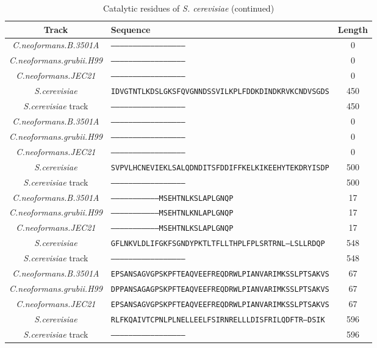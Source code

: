 \begin{table}[htp]\footnotesize
\begin{tabular}{|c|l|c|} \hline
\textbf{Track} & \textbf{Sequence} & \textbf{Length}\\ \hline
\textit{C.neoformans.B.3501A} & \texttt{--------------------------------------------------} & 0
\\
\textit{C.neoformans.grubii.H99} & \texttt{--------------------------------------------------} & 0
\\
\textit{C.neoformans.JEC21} & \texttt{--------------------------------------------------} & 0
\\
\textit{S.cerevisiae} & \texttt{IDVGTNTLKDSLGKSFQVGNNDSSVILKPLFDDKDINDKRVKCNDVSGDS} & 450
\\
\textit{S.cerevisiae} track & \texttt{--------------------------------------------------} & 450
\\
\hline
\textit{C.neoformans.B.3501A} & \texttt{--------------------------------------------------} & 0
\\
\textit{C.neoformans.grubii.H99} & \texttt{--------------------------------------------------} & 0
\\
\textit{C.neoformans.JEC21} & \texttt{--------------------------------------------------} & 0
\\
\textit{S.cerevisiae} & \texttt{SVPVLHCNEVIEKLSALQDNDITSFDDIFFKELKIKEEHYTEKDRYISDP} & 500
\\
\textit{S.cerevisiae} track & \texttt{--------------------------------------------------} & 500
\\
\hline
\textit{C.neoformans.B.3501A} & \texttt{---------------------------------MSEHTNLKSLAPLGNQP} & 17
\\
\textit{C.neoformans.grubii.H99} & \texttt{---------------------------------MSEHTNLKNLAPLGNQP} & 17
\\
\textit{C.neoformans.JEC21} & \texttt{---------------------------------MSEHTNLKSLAPLGNQP} & 17
\\
\textit{S.cerevisiae} & \texttt{GFLNKVLDLIFGKFSGNDYPKTLTFLLTHPLFPLSRTRNL--LSLLRDQP} & 548
\\
\textit{S.cerevisiae} track & \texttt{--------------------------------------------------} & 548
\\
\hline
\textit{C.neoformans.B.3501A} & \texttt{EPSANSAGVGPSKPFTEAQVEEFREQDRWLPIANVARIMKSSLPTSAKVS} & 67
\\
\textit{C.neoformans.grubii.H99} & \texttt{DPPANSAGAGPSKPFTEAQVEEFREQDRWLPIANVARIMKSSLPTSAKVS} & 67
\\
\textit{C.neoformans.JEC21} & \texttt{EPSANSAGVGPSKPFTEAQVEEFREQDRWLPIANVARIMKSSLPTSAKVS} & 67
\\
\textit{S.cerevisiae} & \texttt{RLFKQAIVTCPNLPLNELLEELFSIRNRELLLDISFRILQDFTR--DSIK} & 596
\\
\textit{S.cerevisiae} track & \texttt{--------------------------------------------------} & 596
\\
\hline
\end{tabular}
\caption{Catalytic residues of \textit{S. cerevisiae} (continued)}
\label{tab:active2}
\end{table} \FloatBarrier
